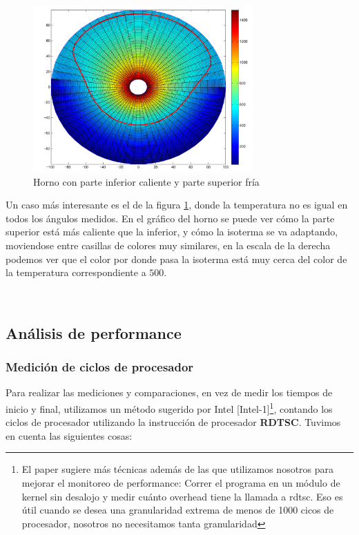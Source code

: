 \clearpage
\begin{figure}[!htb]
    \caption{Horno con parte inferior caliente y parte superior fría}
    \label{exp1-hfc}
\centering
  \includegraphics[width=0.75\textwidth]{figures/friocalor-isoterma-mn19.pdf}
\end{figure}

Un caso más interesante es el de la figura \ref{exp1-hfc}, donde la temperatura no es igual en todos los ángulos medidos. En el gráfico del horno se puede ver cómo la parte superior está más caliente que la inferior, y cómo la isoterma se va adaptando, moviendose entre casillas de colores muy similares, en la escala de la derecha podemos ver que el color por donde pasa la isoterma está muy cerca del color de la temperatura correspondiente a $500$.

~

\clearpage
\subsection{Análisis de performance}
\subsubsection{Medición de ciclos de procesador}

Para realizar las mediciones y comparaciones, en vez de medir los tiempos de inicio y final, utilizamos un método sugerido por Intel [Intel-1]\footnote{El paper sugiere más técnicas además de las que utilizamos nosotros para mejorar el monitoreo de performance: Correr el programa en un módulo de kernel sin desalojo y medir cuánto overhead tiene la llamada a rdtsc. Eso es útil cuando se desea una granularidad extrema de menos de 1000 cicos de procesador, nosotros no necesitamos tanta granularidad}, contando los ciclos de procesador utilizando la instrucción de procesador \textbf{RDTSC}. Tuvimos en cuenta las siguientes cosas:

